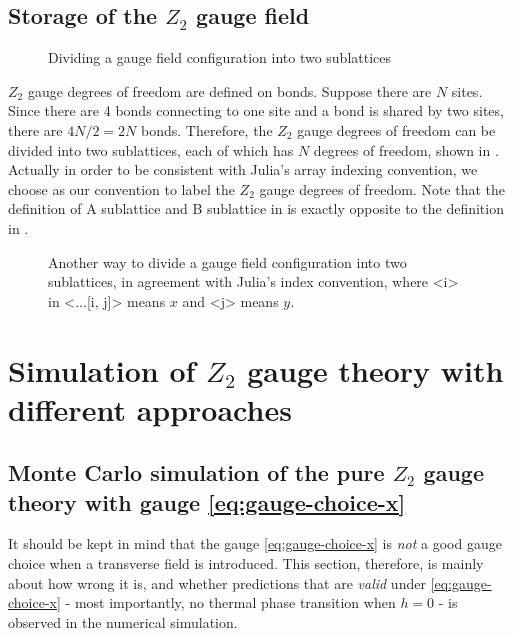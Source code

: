 \documentclass[hyperref, a4paper]{article}
\newcommand*{\Ztwo}{$\mathbb{Z}_2$ }
\def\texttt#1{<#1>}%
\def\mathbb#1{#1}%
\begin{document}
\subsection{Storage of the \Ztwo gauge field}

\begin{figure}
    \centering
    
    \caption{Dividing a gauge field configuration into two sublattices}
    \label{fig:z2-dividing}
\end{figure}

\Ztwo gauge degrees of freedom are defined on bonds. 
Suppose there are $N$ sites. Since there are 4 bonds connecting to one site and a bond is shared by two sites,
there are $4 N / 2 = 2 N$ bonds.
Therefore, the \Ztwo gauge degrees of freedom can be divided into two sublattices, each of which has $N$ degrees of freedom, shown in .
Actually in order to be consistent with Julia's array indexing convention, we choose  as our convention to label the \Ztwo gauge degrees of freedom.
Note that the definition of A sublattice and B sublattice in  is exactly opposite to the definition in .

\begin{figure}
    \centering
    
    \caption{Another way to divide a gauge field configuration into two sublattices, in agreement with Julia's index convention, where \texttt{i} in \texttt{...[i, j]} means $x$ and \texttt{j} means $y$.}
    \label{fig:z2-dividing-real}
\end{figure}


\section{Simulation of \Ztwo gauge theory with different approaches}

\subsection{Monte Carlo simulation of the pure \Ztwo gauge theory with gauge \eqref{eq:gauge-choice-x}}

It should be kept in mind that the gauge \eqref{eq:gauge-choice-x} is \emph{not} a good gauge choice when a transverse field is introduced.
This section, therefore, is mainly about how wrong it is, and whether predictions that are \emph{valid} under \eqref{eq:gauge-choice-x} - most importantly, no thermal phase transition when $h=0$ - is observed in the numerical simulation.
\end{document}
